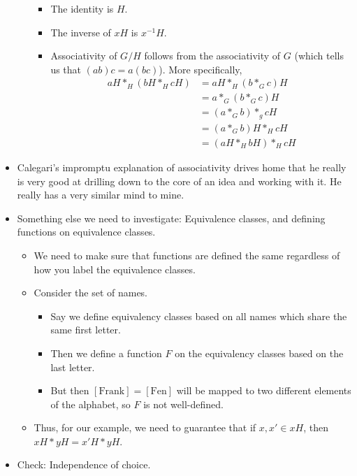 \documentclass[../notes.tex]{subfiles}
\begin{document}
\begin{itemize}
\begin{itemize}
        \begin{itemize}
            \item The identity is $H$.
            \item The inverse of $xH$ is $x^{-1}H$.
            \item Associativity of $G/H$ follows from the associativity of $G$ (which tells us that $(ab)c=a(bc)$). More specifically,
            \begin{align*}
                aH*_H(bH*_HcH) &= aH*_H(b*_Gc)H\\
                &= a*_G(b*_Gc)H\\
                &= (a*_Gb)*_gcH\\
                &= (a*_Gb)H*_HcH\\
                &= (aH*_HbH)*_HcH
            \end{align*}
        \end{itemize}
    \end{itemize}
    \item Calegari's impromptu explanation of associativity drives home that he really is very good at drilling down to the core of an idea and working with it. He really has a very similar mind to mine.
    \item Something else we need to investigate: Equivalence classes, and defining functions on equivalence classes.
    \begin{itemize}
        \item We need to make sure that functions are defined the same regardless of how you label the equivalence classes.
        \item Consider the set of names.
        \begin{itemize}
            \item Say we define equivalency classes based on all names which share the same first letter.
            \item Then we define a function $F$ on the equivalency classes based on the last letter.
            \item But then $[\text{Frank}]=[\text{Fen}]$ will be mapped to two different elements of the alphabet, so $F$ is not well-defined.
        \end{itemize}
        \item Thus, for our example, we need to guarantee that if $x,x'\in xH$, then $xH*yH=x'H*yH$.
    \end{itemize}
    \item Check: Independence of choice.
    \begin{itemize}

\end{itemize}
\end{itemize}
\end{document}
